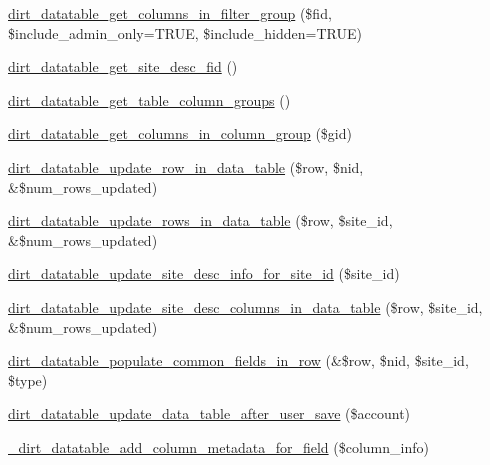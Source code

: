 \begin{DoxyCompactItemize}
\item 
\mbox{\hyperlink{dirt__datatable_8search__table__db__ops_8inc_a244fbd11e380e1d640932dfe65490241}{dirt\+\_\+datatable\+\_\+get\+\_\+columns\+\_\+in\+\_\+filter\+\_\+group}} (\$fid, \$include\+\_\+admin\+\_\+only=T\+R\+UE, \$include\+\_\+hidden=T\+R\+UE)
\item 
\mbox{\hyperlink{dirt__datatable_8search__table__db__ops_8inc_a2376cbae1f14a14ffc1685ed748aac98}{dirt\+\_\+datatable\+\_\+get\+\_\+site\+\_\+desc\+\_\+fid}} ()
\item 
\mbox{\hyperlink{dirt__datatable_8search__table__db__ops_8inc_a6ae4e7112aea1a9d74e51831ada67d5b}{dirt\+\_\+datatable\+\_\+get\+\_\+table\+\_\+column\+\_\+groups}} ()
\item 
\mbox{\hyperlink{dirt__datatable_8search__table__db__ops_8inc_a7a327d58e0847162c4fff78c794311e5}{dirt\+\_\+datatable\+\_\+get\+\_\+columns\+\_\+in\+\_\+column\+\_\+group}} (\$gid)
\item 
\mbox{\hyperlink{dirt__datatable_8search__table__db__ops_8inc_a3401406781a9ffeba3d49396922ebd4a}{dirt\+\_\+datatable\+\_\+update\+\_\+row\+\_\+in\+\_\+data\+\_\+table}} (\$row, \$nid, \&\$num\+\_\+rows\+\_\+updated)
\item 
\mbox{\hyperlink{dirt__datatable_8search__table__db__ops_8inc_a56d526f6ad807d4803b1380894f34e21}{dirt\+\_\+datatable\+\_\+update\+\_\+rows\+\_\+in\+\_\+data\+\_\+table}} (\$row, \$site\+\_\+id, \&\$num\+\_\+rows\+\_\+updated)
\item 
\mbox{\hyperlink{dirt__datatable_8search__table__db__ops_8inc_adc8fd725ebd50be533410926026a8f24}{dirt\+\_\+datatable\+\_\+update\+\_\+site\+\_\+desc\+\_\+info\+\_\+for\+\_\+site\+\_\+id}} (\$site\+\_\+id)
\item 
\mbox{\hyperlink{dirt__datatable_8search__table__db__ops_8inc_a7c062b4f66744b92eaa5b07548650d59}{dirt\+\_\+datatable\+\_\+update\+\_\+site\+\_\+desc\+\_\+columns\+\_\+in\+\_\+data\+\_\+table}} (\$row, \$site\+\_\+id, \&\$num\+\_\+rows\+\_\+updated)
\item 
\mbox{\hyperlink{dirt__datatable_8search__table__db__ops_8inc_a1fd56ef9e9f99e25836a329400eb4102}{dirt\+\_\+datatable\+\_\+populate\+\_\+common\+\_\+fields\+\_\+in\+\_\+row}} (\&\$row, \$nid, \$site\+\_\+id, \$type)
\item 
\mbox{\hyperlink{dirt__datatable_8search__table__db__ops_8inc_a5bb12d672201d673f575798f7473376b}{dirt\+\_\+datatable\+\_\+update\+\_\+data\+\_\+table\+\_\+after\+\_\+user\+\_\+save}} (\$account)
\item 
\mbox{\hyperlink{dirt__datatable_8search__table__db__ops_8inc_ab132b2ff441b1a92ac0b3672368a16ad}{\+\_\+dirt\+\_\+datatable\+\_\+add\+\_\+column\+\_\+metadata\+\_\+for\+\_\+field}} (\$column\+\_\+info)

\end{DoxyCompactItemize}
